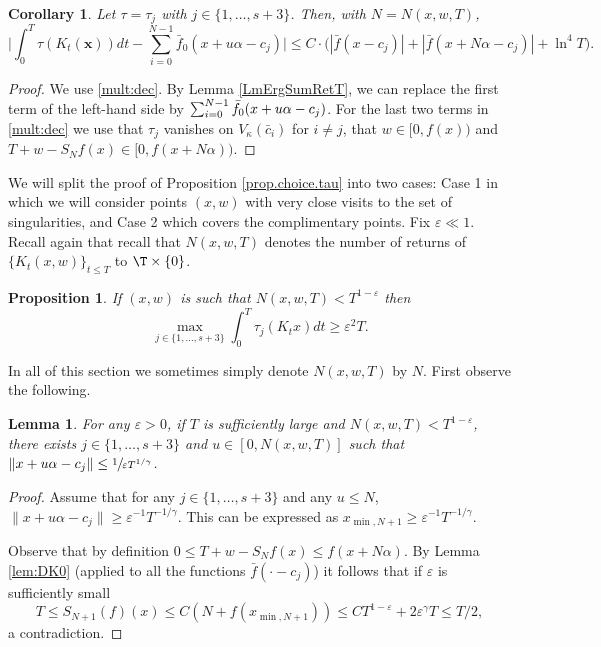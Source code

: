 \documentclass[JEP,XML,SOM,Unicode,NoFloatCountersInSection]{cedram}
\let\DS\relax
\newcommand\bx{\boldsymbol{x}}
\let\eps\varepsilon
\theoremstyle{definition}
\theoremstyle{plain}
\newtheorem{lemma}[definition]{Lemma}
\newtheorem{corollary}[definition]{Corollary}
\newtheorem{proposition}[definition]{Proposition}
\begin{document}
\begin{corollary} \label{LmErgSumRetT2}
Let $\tau=\tau_j$ with $j\in \{1,\ldots, s+3\}$. Then, with $N=N(x,w,T)$,\vspace*{-3pt}
\[
\biggl|\int_{0}^T\tau(K_t(\bx))dt-\sum_{i=0}^{N-1} \bar{f}_0(x+u\alpha-c_j) \biggr|\leq C\cdot\Big(|\bar{f}(x-c_j)|+|\bar{f}(x+N\alpha-c_j)|+\ln^4T\Big).
\]
\end{corollary}

\begin{proof}
We use \eqref{mult:dec}. By Lemma \ref{LmErgSumRetT}, we can
replace the first term of the left-hand side by $\DS \sum_{i=0}^{N-1} \bar{f}_0(x+u\alpha-c_j)$. For the last two terms
in \eqref{mult:dec}
we use that $\tau_j$ vanishes on $V_\kappa(\bar{c}_i)$ for $i\neq j$, that
$ w \in [0,f(x))$ and $T+w-S_Nf(x)\in [0,f(x+N\alpha))$.
\end{proof}

We will split the proof of Proposition \ref{prop.choice.tau} into two cases:
Case 1 in which we will consider points $(x,w)$ with very close visits to the set of singularities, and Case 2 which covers the complimentary points. Fix $\eps\ll 1$. Recall again that recall that $N(x,w,T)$ denotes the number of returns of $\{K_t(x,w)\}_{t\leq T}$ to
$\T\times \{0\}$.

\Subsection*{Case 1. $N(x,w,T)<T^{1-\eps}$}

\begin{proposition} \label{prop.Nsmall} If $(x,w)$ is such that $N(x,w,T)<T^{1-\eps}$ then\vspace*{-3pt}
\begin{equation*} %
\max_{j\in \{1,\ldots,s+3\}} \int_0^T\tau_j(K_tx)dt \geq \eps^2 T.
\end{equation*}
\end{proposition}

In all of this section we sometimes simply denote $N(x,w,T)$ by $N$. First observe the following.

\begin{lemma} \label{lemma.Nsmall2} For any $\eps>0$, if $T$ is sufficiently large and $N(x,w,T)<T^{1-\eps}$, there exists $j\in \{1,\ldots, s+3\}$ and $u\in [0,N(x,w,T)]$ such that $\|x+u\alpha-c_j\|\leq \sfrac{1}{\eps T^{1/\gamma}}$.
\end{lemma}

\begin{proof} Assume that for any $j\in \{1,\ldots, s+3\}$ and any $u\leq N$, $\|x+u\alpha-c_j\|\geq \eps^{-1} T^{-1/\gamma}$. This can be expressed as $x_{\min,N+1}\geq \eps^{-1} T^{-1/\gamma}$.

Observe that by definition $0\leq T+w-S_{N}f(x)\leq f(x+N\alpha)$. By Lemma \ref{lem:DK0} (applied to all the functions $\bar{f}(\cdot-c_j)$) it follows that if $\eps$ is sufficiently small\vspace*{-3pt}
\[
T\leq S_{N+1}(f)(x)\leq C(N+ f(x_{\min,N+1}))\leq CT^{1-\eps}+ 2\eps^\gamma T\leq T/2,
\]
a contradiction.
\end{proof}
\end{document}
